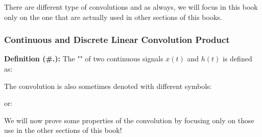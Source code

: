 	There are different type of convolutions and as always, we will focus in this book only on the one that are actually used in other sections of this books.
	
	\subsubsection{Continuous and Discrete Linear Convolution Product}
	\textbf{Definition (\#\thesection.\mydef):} The "\label{continuous convolution}" of two continuous signals $x(t)$ and $h(t)$ is defined as:
	
	
	\begin{tcolorbox}[title=Remark,arc=10pt,breakable,drop lifted shadow,
  skin=enhanced,
  skin first is subskin of={enhancedfirst}{arc=10pt,no shadow},
  skin middle is subskin of={enhancedmiddle}{arc=10pt,no shadow},
  skin last is subskin of={enhancedlast}{drop lifted shadow}]
	The convolution is also sometimes denoted with different symbols:
	
	or:
	
	\end{tcolorbox}
	We will now prove some properties of the convolution by focusing only on those use in the other sections of this book!
